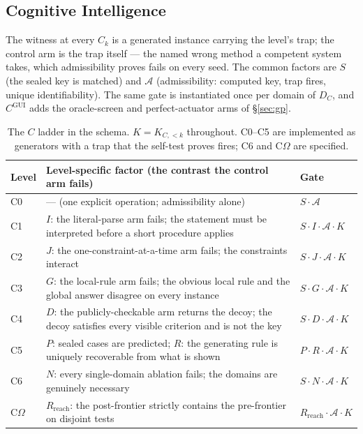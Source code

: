 \documentclass[11pt]{article}
\theoremstyle{definition}
\newcommand{\Om}{\ensuremath{\Omega}}
\begin{document}
\subsection{Cognitive Intelligence}
The witness at every $C_k$ is a generated instance carrying the level's trap; the control arm is the trap itself --- the named wrong method a competent system takes, which admissibility proves fails on every seed. The common factors are $S$ (the sealed key is matched) and $\mathcal A$ (admissibility: computed key, trap fires, unique identifiability). The same gate is instantiated once per domain of $D_C$, and $C^{\mathrm{GUI}}$ adds the oracle-screen and perfect-actuator arms of \S\ref{sec:gp}.
\begin{table}[!htbp]
\centering\small
\begin{tabularx}{\textwidth}{@{}lYl@{}}
\toprule
Level & Level-specific factor (the contrast the control arm fails) & Gate \\
\midrule
C0 & --- (one explicit operation; admissibility alone) & $S\cdot\mathcal A$ \\
C1 & $I$: the literal-parse arm fails; the statement must be interpreted before a short procedure applies & $S\cdot I\cdot\mathcal A\cdot K$ \\
C2 & $J$: the one-constraint-at-a-time arm fails; the constraints interact & $S\cdot J\cdot\mathcal A\cdot K$ \\
C3 & $G$: the local-rule arm fails; the obvious local rule and the global answer disagree on every instance & $S\cdot G\cdot\mathcal A\cdot K$ \\
C4 & $D$: the publicly-checkable arm returns the decoy; the decoy satisfies every visible criterion and is not the key & $S\cdot D\cdot\mathcal A\cdot K$ \\
C5 & $P$: sealed cases are predicted; $R$: the generating rule is uniquely recoverable from what is shown & $P\cdot R\cdot\mathcal A\cdot K$ \\
C6 & $N$: every single-domain ablation fails; the domains are genuinely necessary & $S\cdot N\cdot\mathcal A\cdot K$ \\
C\Om{} & $R_{\mathrm{reach}}$: the post-frontier strictly contains the pre-frontier on disjoint tests & $R_{\mathrm{reach}}\cdot\mathcal A\cdot K$ \\
\bottomrule
\end{tabularx}
\caption{The $C$ ladder in the schema. $K = K_{C,<k}$ throughout. C0--C5 are implemented as generators with a trap that the self-test proves fires; C6 and C\Om{} are specified.}
\label{tab:cstyle}
\end{table}
\end{document}
